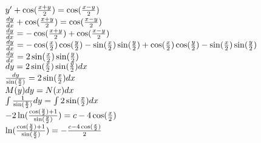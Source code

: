 \documentclass{article}
\begin{document}
\begin{center}
    {
    $y' + \cos(\frac{x + y}{2}) = \cos(\frac{x - y}{2})\\$
    }\\
    {
    $\frac{dy}{dx} + \cos(\frac{x + y}{2}) = \cos(\frac{x - y}{2})\\$
    }\\
    {
    $\frac{dy}{dx} = - \cos(\frac{x + y}{2}) + \cos(\frac{x - y}{2})\\$
    }\\
    {
    $\frac{dy}{dx} = - \cos(\frac{x}{2})\cos(\frac{y}{2}) - \sin(\frac{x}{2})\sin(\frac{y}{2}) + \cos(\frac{x}{2})\cos(\frac{y}{2}) - \sin(\frac{x}{2})\sin(\frac{y}{2})\\$
    }\\
    {
    $\frac{dy}{dx} = 2\sin(\frac{x}{2})\sin(\frac{y}{2})\\$
    }\\
    {
    $dy = 2\sin(\frac{x}{2})\sin(\frac{y}{2})dx\\$
    }\\
    {
    $\frac{dy}{\sin(\frac{y}{2})} = 2\sin(\frac{x}{2})dx\\$
    }\\
    {
    $M(y)dy = N(x)dx\\$
    }\\
    {
    $\int{\frac{1}{\sin(\frac{y}{2})}}dy = \int{2\sin(\frac{x}{2})}dx\\$
    }\\
    {
    $-2\ln(\frac{\cos(\frac{y}{2}) + 1}{\sin(\frac{y}{2})}) = c - 4 \cos(\frac{x}{2})\\$
    }\\
    {
    $\ln(\frac{\cos(\frac{y}{2}) + 1}{\sin(\frac{y}{2})}) = - \frac{c - 4\cos(\frac{x}{2})}{2}\\$
    }\\
\end{center}
\end{document}
